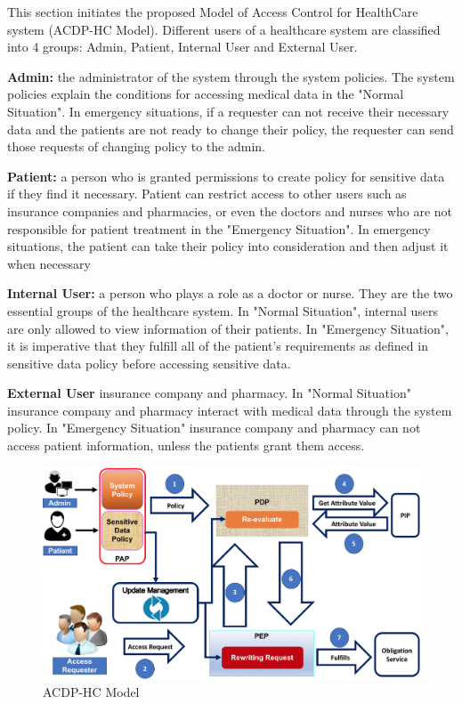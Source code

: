 This section initiates the proposed Model of Access Control for HealthCare system (ACDP-HC Model).
Different users of a healthcare system are classified into 4 groups: Admin, Patient, Internal User and External User. 

\textbf{Admin: }the administrator of the system through the system policies. 
The system policies explain the conditions for accessing medical data in the "Normal Situation".
In emergency situations, if a requester can not receive their necessary data and  the patients are not ready to change their policy, the requester can send those requests of changing policy to the admin.

 \textbf{Patient: }a person who is granted permissions to create policy for sensitive data if they find it necessary. 
Patient can restrict access to other users such as insurance companies and pharmacies, or even the doctors and nurses who are not responsible for patient treatment in the "Emergency Situation".
In emergency situations, the patient can take their policy into consideration and then adjust it when necessary

\textbf{Internal User: }a person who plays a role as a doctor or nurse. 
They are the two essential groups of the healthcare system. 
In  "Normal Situation", internal users are only allowed to view information of their patients. 
In "Emergency Situation", it is imperative that they fulfill all of the patient's requirements as defined in sensitive data policy before accessing sensitive data.

\textbf{External User } insurance company and pharmacy. 
In "Normal Situation" insurance company and pharmacy interact with medical data through the system policy. 
In "Emergency Situation" insurance company and pharmacy can not access patient information, unless the patients grant them access.

\begin{figure}[ht!]
  \centering
  \includegraphics[scale=0.3]{fig/Mainmodel.png}
  \caption{ACDP-HC Model}
  \label{fig.condition}
\end{figure}

